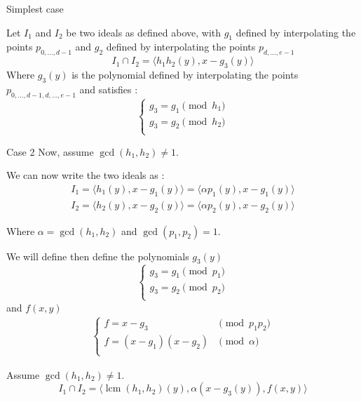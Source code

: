 \documentclass{beamer}
\DeclareMathOperator{\lcm}{lcm}
\begin{document}
\begin{frame}{Simplest case}
\begin{theorem}
    Let $I_{1}$ and $I_{2}$ be two ideals as defined above, with $g_{1}$ defined by interpolating the points $p_{0,\dots,d-1}$ and $g_{2}$ defined by interpolating the points $p_{d,\dots,e-1}$
    \begin{displaymath}
        I_{1} \cap I_{2} = \langle h_{1}h_{2}(y), x - g_{3}(y) \rangle
    \end{displaymath}
    Where $g_{3}(y)$ is the polynomial defined by interpolating the points $p_{0,\dots,d-1,d,\dots,e-1}$ and satisfies :
    \begin{displaymath}
    \left\{
    \begin{array}{ll}
        g_{3} = g_{1} \pmod {h_{1}} \\
        g_{3} = g_{2} \pmod {h_{2}} \\
    \end{array}
    \right.
    \end{displaymath}
\end{theorem}
\end{frame}

\begin{frame}{Case 2}
    Now, assume $\gcd(h_{1}, {h_2}) \neq 1$.

We can now write the two ideals as :
\begin{align*}
    I_{1} = \langle h_{1}(y), x - g_{1}(y) \rangle = \langle \alpha p_{1}(y), x - g_{1}(y) \rangle \\
    I_{2} = \langle h_{2}(y), x - g_{2}(y) \rangle = \langle \alpha p_{2}(y), x - g_{2}(y) \rangle
\end{align*}

Where $\alpha = \gcd(h_{1}, h_{2})$ and $\gcd(p_{1}, p_{2}) = 1$.

We will define then define the polynomials $g_{3}(y)$
\begin{displaymath}
    \left\{
    \begin{array}{ll}
        g_{3} = g_{1} \pmod {p_{1}} \\
        g_{3} = g_{2} \pmod {p_{2}} \\
    \end{array}
    \right.
\end{displaymath}
and $f(x, y)$
\begin{align*}
    \left\{
    \begin{array}{ll}
        f = x - g_{3}           & \pmod {p_{1}p_{2}}         \\
        f = (x-g_{1})(x-g_{2})  & \pmod {\alpha}             \\
    \end{array}
    \right.
\end{align*}

\begin{theorem} \label{th:inter-2-gcd-neq-1}
    Assume $\gcd(h_{1}, h_{2}) \neq 1$.
    \begin{displaymath}
        I_{1} \cap I_{2} = \langle \lcm(h_{1}, h_{2})(y), \alpha (x - g_{3}(y)), f(x,y) \rangle
    \end{displaymath}
\end{theorem}
\end{frame}
\end{document}
